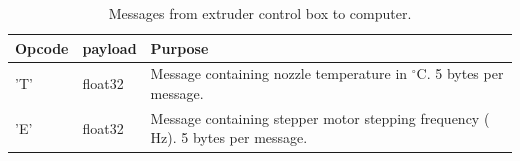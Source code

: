 \documentclass[10pt]{article}
\newcommand{\tabrowA}{\rowcolor{tabrowcolorA}}
\begin{document}
\begin{table}[h]
	\centering
	{
	\captionsetup{width=\linewidth}
	\caption{Messages from extruder control box to computer.}
	\label{tab:messages_from_extruder_to_computer}
	}
	\vspace{-0.6em}
	\setlength\tabcolsep{6pt} %
	\begin{tabular}{>{\centering}p{0.065\linewidth}>{\centering}p{0.08\linewidth}
	p{0.865\linewidth}}
	\toprule
	Opcode & payload & Purpose \\
	\midrule
	\tabrowA 'T' & float32 & Message containing nozzle temperature in $^\circ\text{C}$. 5 bytes per message. \\[3pt]
	'E' & float32 & Message containing stepper motor stepping frequency ($\text{Hz}$). 5 bytes per message. \\[3pt]
	\bottomrule
	\end{tabular}
\end{table}
\end{document}
